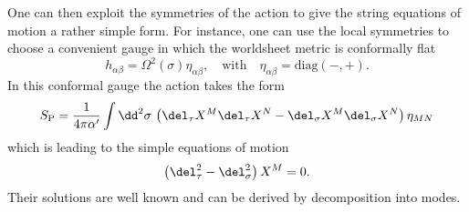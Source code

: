 %
%
One can then exploit the symmetries of the  action to give the string equations of motion a rather simple form. For instance, one can use the local symmetries to choose a convenient gauge in which the worldsheet metric is conformally flat
%
%
\begin{equation}
h_{\alpha\beta} = \Omega^{2}(\sigma) \eta_{\alpha\beta}, \quad \text{with} \quad \eta_{\alpha\beta} = \text{diag}(-,+).
\end{equation}
%
%
In this conformal gauge the  action takes the form
%
%
\begin{equation}
S_{\rm P} = \frac{1}{4\pi\alpha'} \int \dd^{2}\sigma\, \left(\del_{\tau}X^{M}\del_{\tau}X^{N}-\del_{\sigma}X^{M}\del_{\sigma}X^{N}\right)\eta_{MN}
\end{equation}
%
%
which is leading to the simple equations of motion
%
%
\begin{equation}
\left(\del_{\tau}^{2}-\del_{\sigma}^{2}\right)X^{M}=0.
\end{equation}
%
%
Their solutions are well known and can be derived by decomposition into  modes.
%
%
%
%
%
%
%
%
%
%
